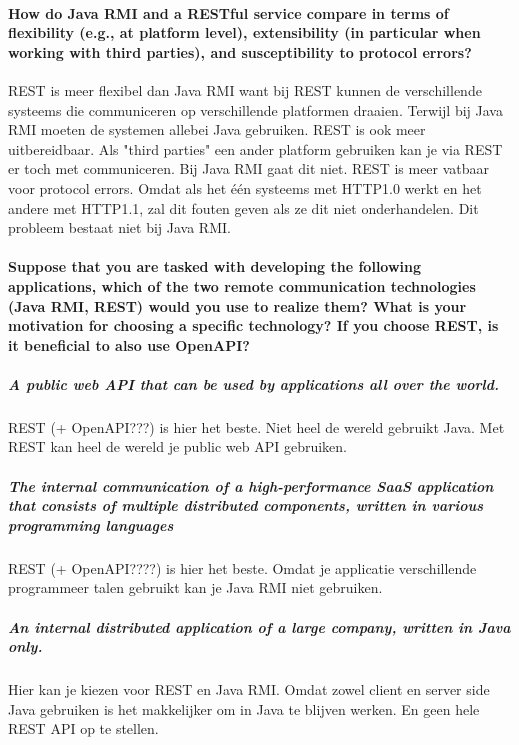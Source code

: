 \documentclass{ds-report}
\begin{document}
    \paragraph{How do Java RMI and a RESTful service compare in terms of flexibility (e.g., at platform level), extensibility (in particular when working with third parties), and susceptibility to protocol errors?}
    REST is meer flexibel dan Java RMI want bij REST kunnen de verschillende systeems die communiceren op verschillende platformen draaien. Terwijl bij Java RMI moeten de systemen allebei Java gebruiken. REST is ook meer uitbereidbaar. Als "third parties" een ander platform gebruiken kan je via REST er toch met communiceren. Bij Java RMI gaat dit niet. REST is meer vatbaar voor protocol errors. Omdat als het één systeems met HTTP1.0 werkt en het andere met HTTP1.1, zal dit fouten geven als ze dit niet onderhandelen. Dit probleem bestaat niet bij Java RMI.

    \paragraph{Suppose that you are tasked with developing the following applications, which of the two remote communication technologies (Java RMI, REST) would you use to realize them? What is your motivation for choosing a specific technology? If you choose REST, is it beneficial to also use OpenAPI? }
    \subparagraph{A public web API that can be used by applications all over the world.}
    REST (+ OpenAPI???) is hier het beste. Niet heel de wereld gebruikt Java. Met REST kan heel de wereld je public web API gebruiken.
    \subparagraph{The internal communication of a high-performance SaaS application that consists of multiple distributed components, written in various programming languages}
    REST (+ OpenAPI????) is hier het beste. Omdat je applicatie verschillende programmeer talen gebruikt kan je Java RMI niet gebruiken.
    \subparagraph{An internal distributed application of a large company, written in Java only.}
    Hier kan je kiezen voor REST en Java RMI. Omdat zowel client en server side Java gebruiken is het makkelijker om in Java te blijven werken. En geen hele REST API op te stellen.

    
	\clearpage
	
	
\end{document}
